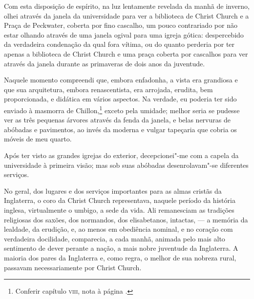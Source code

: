 Com esta disposição de espírito, na luz lentamente revelada da
manhã de inverno, olhei através da janela da universidade para ver a
biblioteca de Christ Church e a Praça de Peckwater, coberta por fino
cascalho, um pouco contrariado por não estar olhando através de uma
janela ogival para uma igreja gótica: despercebido da verdadeira
condenação da qual fora vítima, ou do quanto perderia por ter apenas a
biblioteca de Christ Church e uma praça coberta por cascalhos para ver
através da janela durante as primaveras de dois anos da juventude.

Naquele momento compreendi que, embora enfadonha, a vista era grandiosa
e que sua arquitetura, embora renascentista, era arrojada, erudita, bem
proporcionada, e didática em vários aspectos. Na verdade, eu poderia ter
sido enviado à masmorra de Chillon,\footnote{Conferir capítulo \textsc{viii},
  nota à página \pageref{chillon}.} exceto pela umidade; melhor seria se
pudesse ver as três pequenas árvores através da fenda da janela, e belas
nervuras de abóbadas e pavimentos, ao invés da moderna e vulgar
tapeçaria que cobria os móveis de meu quarto.

Após ter visto as grandes igrejas do exterior, decepcionei"-me com a
capela da universidade à primeira visão; mas sob suas abóbadas
desenrolavam"-se diferentes serviços.

No geral, dos lugares e dos serviços importantes para as almas cristãs
da Inglaterra, o coro da Christ Church representava, naquele período da
história inglesa, virtualmente o umbigo, a sede da vida. Ali remanesciam
as tradições religiosas dos saxões, dos normandos, dos elisabetanos,
intactas, --- a memória da lealdade, da erudição, e, ao menos em
obediência nominal, e no coração com verdadeira docilidade, comparecia,
a cada manhã, animada pelo mais alto sentimento de dever perante a
nação, a mais nobre juventude da Inglaterra. A maioria dos pares da
Inglaterra e, como regra, o melhor de sua nobreza rural, passavam
necessariamente por Christ Church.

